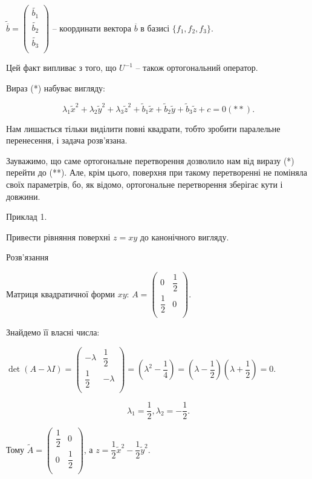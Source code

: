 $\tilde{\overline{b}} = \begin{pmatrix}
	\tilde{b_1} \\
	\tilde{b_2} \\
	\tilde{b_3} \\
\end{pmatrix}$ -- координати вектора $\overline{b}$ в базисі $\{f_1, f_2, f_3\}$.

Цей факт випливає з того, що $U^{-1}$ -- також ортогональний оператор.

Вираз (*) набуває вигляду:

$$\lambda_1 \tilde{x}^2 + \lambda_2 \tilde{y}^2 + \lambda_3 \tilde{z}^2
+ \tilde{b}_1 \tilde{x} + \tilde{b}_2 \tilde{y} + \tilde{b}_3 \tilde{z}
+ c = 0 (**).$$

Нам лишається тільки виділити повні квадрати, тобто зробити
паралельне перенесення, і задача розв’язана.

Зауважимо, що саме ортогональне перетворення дозволило нам від
виразу (*) перейти до (**). Але, крім цього, поверхня при такому
перетворенні не поміняла своїх параметрів, бо, як відомо, ортогональне
перетворення зберігає кути і довжини.

Приклад 1.

Привести рівняння поверхні $z = x y$ до канонічного вигляду.

Розв’язання

Матриця квадратичної форми $x y$: $A = \begin{pmatrix}
	0 & \dfrac{1}{2} \\
	\dfrac{1}{2} & 0 \\
\end{pmatrix}.$

Знайдемо її власні числа: 

$\det(A-\lambda I) = \begin{pmatrix}
	-\lambda & \dfrac{1}{2} \\
	\dfrac{1}{2} & -\lambda \\
\end{pmatrix} = (\lambda^2 - \dfrac{1}{4}) = (\lambda - \dfrac{1}{2})(\lambda + \dfrac{1}{2}) = 0.$

$$\lambda_1 = \dfrac{1}{2}, \lambda_2 = -\dfrac{1}{2}.$$

Тому $\tilde{A} = \begin{pmatrix}
	\dfrac{1}{2} & 0 \\
	0 & \dfrac{1}{2} \\
\end{pmatrix}$, а $z = \dfrac{1}{2} \tilde{x}^2 - \dfrac{1}{2} \tilde{y}^2.$

